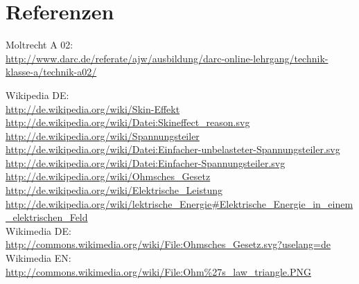 \section{Referenzen}
	\begin{small}
    \begin{thebibliography}{}
      Moltrecht A 02: \\
                    \url{http://www.darc.de/referate/ajw/ausbildung/darc-online-lehrgang/technik-klasse-a/technik-a02/}
                    
        Wikipedia DE: \\
                    \url{http://de.wikipedia.org/wiki/Skin-Effekt}\\
                    \url{http://de.wikipedia.org/wiki/Datei:Skineffect_reason.svg}\\
                    \url{http://de.wikipedia.org/wiki/Spannungsteiler}\\
                    \url{http://de.wikipedia.org/wiki/Datei:Einfacher-unbelasteter-Spannungsteiler.svg}\\
                    \url{http://de.wikipedia.org/wiki/Datei:Einfacher-Spannungsteiler.svg}\\
      				\url{http://de.wikipedia.org/wiki/Ohmsches_Gesetz}\\ 
                    \url{http://de.wikipedia.org/wiki/Elektrische_Leistung}\\ 
                    \url{http://de.wikipedia.org/wiki/lektrische_Energie#Elektrische_Energie_in_einem_elektrischen_Feld}\\ 
                    
    	Wikimedia DE:\\
    				\url{http://commons.wikimedia.org/wiki/File:Ohmsches_Gesetz.svg?uselang=de}\\
   		Wikimedia EN:\\
   					\url{http://commons.wikimedia.org/wiki/File:Ohm\%27s_law_triangle.PNG}
   \end{thebibliography}
	\end{small}


